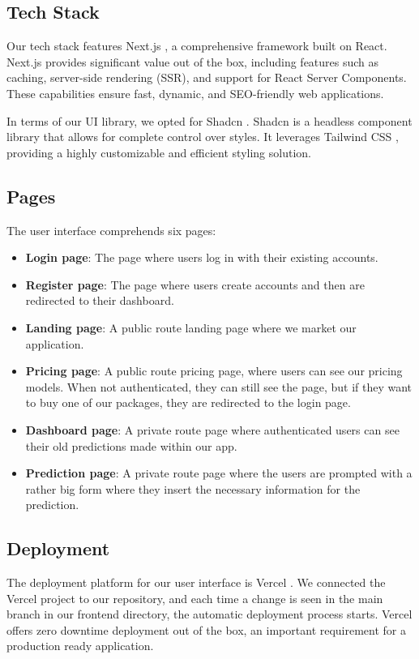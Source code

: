 \subsection{Tech Stack}
Our tech stack features Next.js \cite{nextjs}, a comprehensive framework built on React. Next.js provides significant value out of the box, including features such as caching, server-side rendering (SSR), and support for React Server Components. These capabilities ensure fast, dynamic, and SEO-friendly web applications.

In terms of our UI library, we opted for Shadcn \cite{shadcn}. Shadcn is a headless component library that allows for complete control over styles. It leverages Tailwind CSS \cite{tailwind_css}, providing a highly customizable and efficient styling solution.

\subsection{Pages}
The user interface comprehends six pages:

\begin{itemize}
    \item \textbf{Login page}: The page where users log in with their existing accounts.
    \item \textbf{Register page}: The page where users create accounts and then are redirected to their dashboard.
    \item \textbf{Landing page}: A public route landing page where we market our application.
    \item \textbf{Pricing page}: A public route pricing page, where users can see our pricing models. When not authenticated, they can still see the page, but if they want to buy one of our packages, they are redirected to the login page.
    \item \textbf{Dashboard page}: A private route page where authenticated users can see their old predictions made within our app.
    \item \textbf{Prediction page}: A private route page where the users are prompted with a rather big form where they insert the necessary information for the prediction.
\end{itemize}

\subsection{Deployment}
The deployment platform for our user interface is Vercel \cite{vercel}. We connected the Vercel project to our repository, and each time a change is seen in the main branch in our frontend directory, the automatic deployment process starts. Vercel offers zero downtime deployment out of the box, an important requirement for a production ready application.

